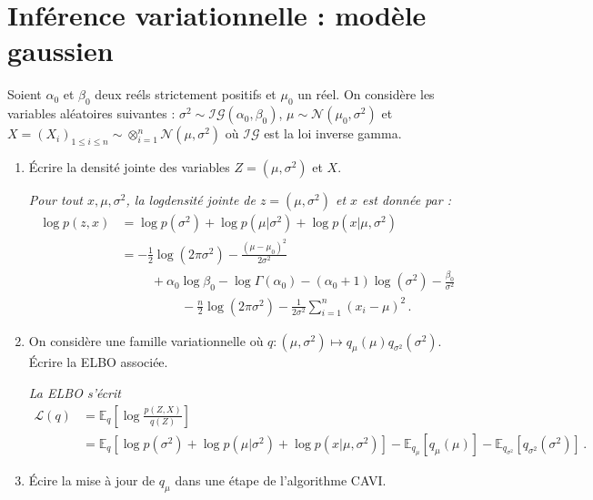 \documentclass[a4paper,10pt,fleqn]{article}
\newcommand{\1}{\ensuremath{\mathbbm{1}}}
\begin{document}
\section{Inf\'erence variationnelle : mod\`ele gaussien}
Soient $\alpha_0$ et $\beta_0$ deux re\'els strictement positifs et $\mu_0$ un r\'eel. On consid\`ere les variables al\'eatoires suivantes : $\sigma^2 \sim\mathcal{IG}(\alpha_0,\beta_0)$, $\mu\sim\mathcal{N}(\mu_0,\sigma^2)$ et $X = (X_i)_{1\leq i\leq n}\sim\otimes_{i=1}^n\mathcal{N}(\mu,\sigma^2)$ o\`u $\mathcal{IG}$ est la loi inverse gamma.
\begin{enumerate}
\item \'Ecrire la densit\'e jointe des variables $Z=(\mu,\sigma^2)$ et $X$.

\vspace{.2cm}

{\em
Pour tout $x,\mu,\sigma^2$, la logdensit\'e jointe de $z=(\mu,\sigma^2)$ et $x$ est donn\'ee par :
\begin{align*}
\log p (z,x) &= \log p(\sigma^2) + \log p(\mu|\sigma^2) + \log p(x|\mu,\sigma^2)\\
&= -\frac{1}{2}\log(2\pi \sigma^2) - \frac{(\mu-\mu_0)^2}{2\sigma^2} \\
&\hspace{1cm} + \alpha_0\log \beta_0 - \log \Gamma(\alpha_0) - (\alpha_0+1)\log(\sigma^{2}) - \frac{\beta_0}{\sigma^2}\\
&\hspace{2cm} -\frac{n}{2}\log(2\pi \sigma^2) - \frac{1}{2\sigma^2}\sum_{i=1}^n(x_i-\mu)^2\,.
\end{align*}
}

\item On consid\`ere une famille variationnelle o\`u $q:(\mu,\sigma^2)\mapsto q_\mu(\mu)q_{\sigma^2}(\sigma^2)$. \'Ecrire la ELBO associ\'ee.

\vspace{.2cm}

{\em
La ELBO s'\'ecrit
\begin{align*}
\mathcal{L}(q) &= \mathbb{E}_q\left[\log\frac{p(Z,X)}{q(Z)}\right]\\
&= \mathbb{E}_q\left[\log p(\sigma^2) + \log p(\mu|\sigma^2) + \log p(x|\mu,\sigma^2)\right] - \mathbb{E}_{q_\mu}\left[q_{\mu}(\mu)\right] - \mathbb{E}_{q_{\sigma^2}}\left[q_{\sigma^2}(\sigma^2)\right]\,.
\end{align*}
}
\item \'Ecire la mise \`a jour de $q_\mu$ dans une \'etape de l'algorithme CAVI. 


\end{enumerate}
\end{document}
